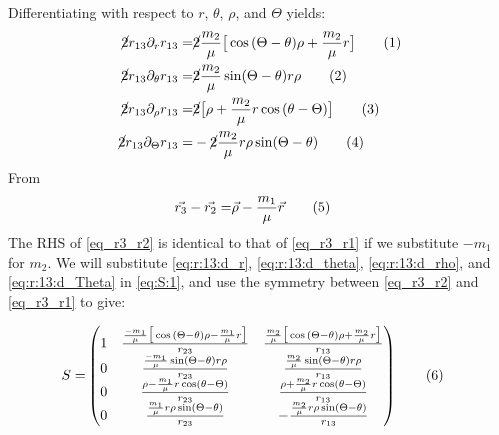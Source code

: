 \documentclass[]{article}
\newcommand\numberthis{\addtocounter{equation}{1}\tag{\theequation}}
\begin{document}
Differentiating with respect to $r$, $\theta$, $\rho$, and $\Theta$ yields:
\begin{align*}	
	\cancel{2}r_{13} \partial_r r_{13} =&\cancel{2} \frac{m_2}{\mu} \big[\cos{(\Theta-\theta)} \rho + \frac{m_2}{\mu} r\big] \numberthis \label{eq:r:13:d_r} \\
	\cancel{2}r_{13} \partial_{\theta} r_{13} =&\cancel{2} \frac{m_2}{\mu} \sin(\Theta-\theta) r \rho \numberthis \label{eq:r:13:d_theta}\\
	\cancel{2}r_{13} \partial_{\rho} r_{13} =& \cancel{2}\big[\rho + \frac{m_2}{\mu} r \cos{(\theta-\Theta)}\big] \numberthis \label{eq:r:13:d_rho}\\
	\cancel{2}r_{13} \partial_{\Theta} r_{13} 	=& -\cancel{2}\frac{m_2}{\mu}r \rho \sin(\Theta-\theta) \numberthis \label{eq:r:13:d_Theta}
\end{align*}
From  \cite[(27c)]{kotovych2002exactly}
\begin{align*}
	\vec{r_3} - \vec{r_2} =& \vec{\rho} - \frac{m_1}{\mu}\vec{r} \numberthis \label{eq_r3_r2}
\end{align*}
The RHS of \eqref{eq_r3_r2} is identical to that of \eqref{eq_r3_r1} if we substitute $-m_1$ for $m_2$.
We will substitute \eqref{eq:r:13:d_r}, \eqref{eq:r:13:d_theta}, \eqref{eq:r:13:d_rho}, and \eqref{eq:r:13:d_Theta} in \eqref{eq:S:1}, and use the symmetry between \eqref{eq_r3_r2}  and \eqref{eq_r3_r1}  to give:

\begin{align*}
	S =& \begin{pmatrix}
		1& \frac{\frac{-m_1}{\mu} \big[\cos{(\Theta-\theta)} \rho - \frac{m_1}{\mu} r\big]}{r_{23}} & \frac{\frac{m_2}{\mu} \big[\cos{(\Theta-\theta)} \rho + \frac{m_2}{\mu} r\big]}{r_{13}}\\
		0& \frac{\frac{-m_1}{\mu} \sin(\Theta-\theta) r \rho}{r_{23}} & \frac{\frac{m_2}{\mu} \sin(\Theta-\theta) r \rho}{r_{13}}\\
		0& \frac{\rho - \frac{m_1}{\mu} r \cos(\theta-\Theta)}{r_{23}} & \frac{\rho + \frac{m_2}{\mu} r \cos(\theta-\Theta)}{r_{13}}\\
		0& \frac{\frac{m_1}{\mu}r \rho \sin(\Theta-\theta)}{r_{23}}& -\frac{\frac{m_2}{\mu} r \rho \sin(\Theta-\theta)}{r_{13}}
	\end{pmatrix}    \numberthis \label{eq:S2}
\end{align*}
\end{document}
